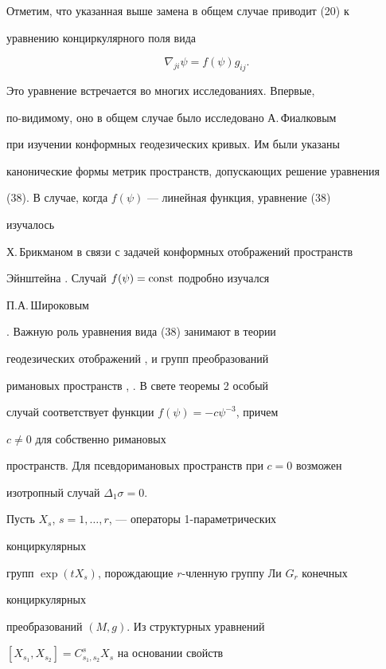 Отметим, что указанная выше замена в общем случае приводит (20) к


уравнению конциркулярного поля вида


\begin{equation}


\nabla_{ji}\psi=f(\psi)g_{ij}.


\end{equation}


Это уравнение встречается во многих исследованиях. Впервые,


по-видимому, оно в общем случае было исследовано А.\,Фиалковым \cite{9}


при изучении конформных геодезических кривых. Им были указаны


канонические формы метрик пространств, допускающих решение уравнения


(38). В случае, когда $f(\psi)$ --- линейная функция, уравнение (38)


изучалось


Х.\,Брикманом в связи с задачей конформных отображений пространств


Эйнштейна \cite{10}. Случай $f(\psi)=\operatorname{const}$ подробно изучался


П.А.\,Широковым


\cite{11}. Важную роль уравнения вида (38) занимают в теории


геодезических отображений \cite{3}, \cite{12} и групп преобразований


римановых пространств \cite{13}, \cite{14}. В свете теоремы 2 особый


случай соответствует функции $f(\psi)=-c\psi^{-3}$, причем


$c\ne 0$ для собственно римановых


пространств. Для псевдоримановых пространств при $c=0$ возможен


изотропный случай $\Delta_1\sigma=0$.





Пусть $X_s$, $s=1,\dotsc,r$, --- операторы 1-параметрических


конциркулярных


групп $\exp(t X_s)$, порождающие $r$-членную группу Ли $G_r$ конечных


конциркулярных


преобразований $(M,g)$. Из структурных уравнений


$[X_{s_1},X_{s_2}]=C^s_{s_1,s_2}X_s$ на основании свойств


